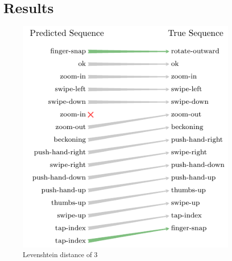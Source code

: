\chapter{Results}
\label{cha:results}


\begin{figure}[h]
  \centering
  \includegraphics{figures/results/levenshtein}
  \caption{Levenshtein distance of 3}
  \label{fig:levenshtein}
\end{figure}
